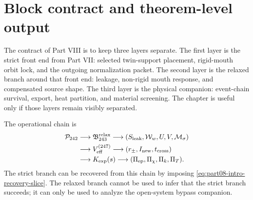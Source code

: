 
\section{Block contract and theorem-level output}
\label{sec:part08-block-contract}

The contract of Part VIII is to keep three layers separate.  The first layer is the strict front end from Part VII: selected twin-support placement, rigid-mouth orbit lock, and the outgoing normalization packet.  The second layer is the relaxed branch around that front end: leakage, non-rigid mouth response, and compensated source shape.  The third layer is the physical companion: event-chain survival, export, heat partition, and material screening.  The chapter is useful only if those layers remain visibly separated.

The operational chain is
\begin{equation}
\label{eq:part08-operational-chain}
\begin{aligned}
\mathcal P_{242}
&\longrightarrow
\mathfrak B_{243}^{\rm relax}
\longrightarrow
(S_{\rm leak},\mathcal W_w,U,V,\mathcal M_\sigma)
\\
&\longrightarrow
V_{\rm eff}^{(247)}
\longrightarrow
(r_\pm,I_{\rm new},t_{\rm cross})
\\
&\longrightarrow
K_{\rm exp}(s)
\longrightarrow
(\Pi_{\rm ep},\Pi_\chi,\Pi_k,\Pi_T).
\end{aligned}
\end{equation}
The strict branch can be recovered from this chain by imposing \cref{eq:part08-intro-recovery-slice}.  The relaxed branch cannot be used to infer that the strict branch succeeds; it can only be used to analyze the open-system bypass companion.

